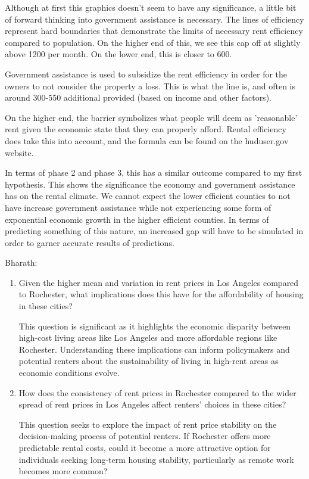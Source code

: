 \documentclass[a4paper]{article}
\begin{document}
\begin{enumerate}
\begin{enumerate}
    Although at first this graphics doesn't seem to have any significance, a little bit of forward thinking into government assistance is necessary. The lines of efficiency represent hard boundaries that demonstrate the limits of necessary rent efficiency compared to population. On the higher end of this, we see this cap off at slightly above 1200 per month. On the lower end, this is closer to 600. 
    
    Government assistance is used to subsidize the rent efficiency in order for the owners to not consider the property a loss. This is what the line is, and often is around 300-550 additional provided (based on income and other factors).

    On the higher end, the barrier symbolizes what people will deem as 'reasonable' rent given the economic state that they can properly afford. Rental efficiency does take this into account, and the formula can be found on the huduser.gov website. 

    In terms of phase 2 and phase 3, this has a similar outcome compared to my first hypothesis. This shows the significance the economy and government assistance has on the rental climate. We cannot expect the lower efficient counties to not have increase government assistance while not experiencing some form of exponential economic growth in the higher efficient counties. In terms of predicting something of this nature, an increased gap will have to be simulated in order to garner accurate results of predictions. 
    
  \end{enumerate}

  Bharath:

  \begin{enumerate}
    \item Given the higher mean and variation in rent prices in Los Angeles compared to Rochester, what implications does this have for the affordability of housing in these cities? 

    This question is significant as it highlights the economic disparity between high-cost living areas like Los Angeles and more affordable regions like Rochester. Understanding these implications can inform policymakers and potential renters about the sustainability of living in high-rent areas as economic conditions evolve.

    \bigbreak
    \item How does the consistency of rent prices in Rochester compared to the wider spread of rent prices in Los Angeles affect renters' choices in these cities?

    This question seeks to explore the impact of rent price stability on the decision-making process of potential renters. If Rochester offers more predictable rental costs, could it become a more attractive option for individuals seeking long-term housing stability, particularly as remote work becomes more common?

\end{enumerate}

\end{enumerate}
\end{document}
